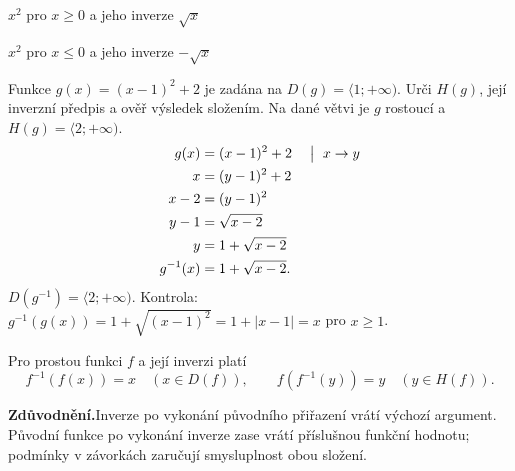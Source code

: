 \documentclass[11pt,a4paper]{article}
\begin{document}
\begin{center}
\begin{minipage}{.47\linewidth}\centering
{}\par\footnotesize $x^2$ pro $x\ge0$ a jeho inverze $\sqrt{x}$
\end{minipage}\hfill
\begin{minipage}{.47\linewidth}\centering
{}\par\footnotesize $x^2$ pro $x\le0$ a jeho inverze $-\sqrt{x}$
\end{minipage}
\end{center}

\clearpage
{}
\begin{prikladReseniBox}[title={Příklad 2}]
Funkce $g(x)=(x-1)^2+2$ je zadána na $D(g)=\langle1;+\infty)$. Urči $H(g)$, její inverzní předpis a ověř výsledek složením.
\tcblower
Na dané větvi je $g$ rostoucí a $H(g)=\langle2;+\infty)$.
\[
\begin{aligned}
g(x)&=(x-1)^2+2 &&\bigm|\ x\to y\\
x&=(y-1)^2+2\\
x-2&=(y-1)^2\\
y-1&=\sqrt{x-2}\\
y&=1+\sqrt{x-2}\\
g^{-1}(x)&=1+\sqrt{x-2}.
\end{aligned}
\]
$D(g^{-1})=\langle2;+\infty)$. Kontrola: $g^{-1}(g(x))=1+\sqrt{(x-1)^2}=1+|x-1|=x$ pro $x\ge1$.
\end{prikladReseniBox}

\begin{zadaniBox}[title={Věta - Složení inverzních funkcí}]
Pro prostou funkci $f$ a její inverzi platí
\[
f^{-1}(f(x))=x\quad (x\in D(f)),\qquad f(f^{-1}(y))=y\quad (y\in H(f)).
\]
\end{zadaniBox}
\noindent\textbf{Zdůvodnění.}\enspace Inverze po vykonání původního přiřazení vrátí výchozí argument. Původní funkce po vykonání inverze zase vrátí příslušnou funkční hodnotu; podmínky v závorkách zaručují smysluplnost obou složení.
\end{document}
